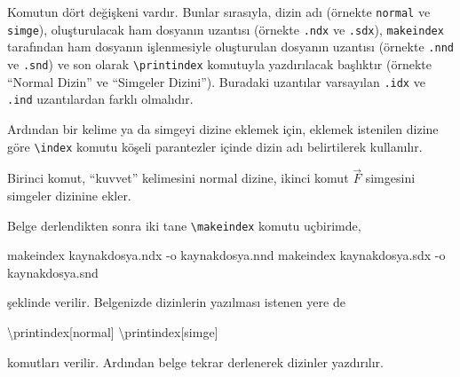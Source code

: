 \documentclass[
  letterpaper,
  DIV=11,
  numbers=noendperiod]{scrreprt}
\newenvironment{Shaded}{\begin{snugshade}}{\end{snugshade}}
\newcommand{\AttributeTok}[1]{\textcolor[rgb]{0.40,0.45,0.13}{#1}}
\newcommand{\ExtensionTok}[1]{\textcolor[rgb]{0.00,0.23,0.31}{#1}}
\newcommand{\FunctionTok}[1]{\textcolor[rgb]{0.28,0.35,0.67}{#1}}
\newcommand{\NormalTok}[1]{\textcolor[rgb]{0.00,0.23,0.31}{#1}}
\newcommand{\SpecialCharTok}[1]{\textcolor[rgb]{0.37,0.37,0.37}{#1}}
\newcommand{\SpecialStringTok}[1]{\textcolor[rgb]{0.13,0.47,0.30}{#1}}
\begin{document}
Komutun dört değişkeni vardır. Bunlar sırasıyla, dizin adı (örnekte
\texttt{normal} ve \texttt{simge}), oluşturulacak ham dosyanın uzantısı
(örnekte \texttt{.ndx} ve \texttt{.sdx}), \texttt{makeindex} tarafından
ham dosyanın işlenmesiyle oluşturulan dosyanın uzantısı (örnekte
\texttt{.nnd} ve \texttt{.snd}) ve son olarak
\texttt{\textbackslash{}printindex} komutuyla yazdırılacak başlıktır
(örnekte ``Normal Dizin'' ve ``Simgeler Dizini''). Buradaki uzantılar
varsayılan \texttt{.idx} ve \texttt{.ind} uzantılardan farklı olmalıdır.

Ardından bir kelime ya da simgeyi dizine eklemek için, eklemek istenilen
dizine göre \texttt{\textbackslash{}index} komutu köşeli parantezler
içinde dizin adı belirtilerek kullanılır.

\begin{Shaded}
\end{Shaded}

Birinci komut, ``kuvvet'' kelimesini normal dizine, ikinci komut
\(\vec{F}\) simgesini simgeler dizinine ekler.

Belge derlendikten sonra iki tane \texttt{\textbackslash{}makeindex}
komutu uçbirimde,

\begin{Shaded}
\begin{Highlighting}[]
\ExtensionTok{makeindex}\NormalTok{ kaynakdosya.ndx }\AttributeTok{{-}o}\NormalTok{ kaynakdosya.nnd }
\ExtensionTok{makeindex}\NormalTok{ kaynakdosya.sdx }\AttributeTok{{-}o}\NormalTok{ kaynakdosya.snd }
\end{Highlighting}
\end{Shaded}

şeklinde verilir. Belgenizde dizinlerin yazılması istenen yere de

\begin{Shaded}
\begin{Highlighting}[]
\FunctionTok{\textbackslash{}printindex}\NormalTok{[normal]}
\FunctionTok{\textbackslash{}printindex}\NormalTok{[simge]}
\end{Highlighting}
\end{Shaded}

komutları verilir. Ardından belge tekrar derlenerek dizinler yazdırılır.
\end{document}

